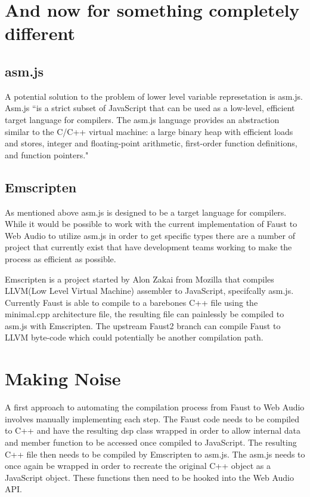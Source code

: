 \documentclass[runningheads,a4paper]{llncs}
\begin{document}
\section{And now for something completely different}

\subsection{asm.js}

A potential solution to the problem of lower level variable represetation is asm.js.  Asm.js ``is a strict subset of JavaScript that can be used as a low-level, efficient target language for compilers. The asm.js language provides an abstraction similar to the C/C++ virtual machine: a large binary heap with efficient loads and stores, integer and floating-point arithmetic, first-order function definitions, and function pointers."\cite{asm-js}

\subsection{Emscripten}

As mentioned above asm.js is designed to be a target language for compilers.  While it would be possible to work with the current implementation of Faust to Web Audio to utilize asm.js in order to get specific types there are a number of project that currently exist that have development teams working to make the process as efficient as possible.

Emscripten is a project started by Alon Zakai from Mozilla that compiles LLVM(Low Level Virtual Machine) assembler to JavaScript, specifcally asm.js.\cite{Emscripten} Currently Faust is able to compile to a barebones C++ file using the minimal.cpp architecture file, the resulting file can painlessly be compiled to asm.js with Emscripten.  The upstream Faust2 branch can compile Faust to LLVM byte-code which could potentially be another compilation path.

\section{Making Noise}

A first approach to automating the compilation process from Faust to Web Audio involves manually implementing each step. The Faust code needs to be compiled to C++ and have the resulting dsp class wrapped in order to allow internal data and member function to be accessed once compiled to JavaScript.  The resulting C++ file then needs to be compiled by Emscripten to asm.js.  The asm.js needs to once again be wrapped in order to recreate the original C++ object as a JavaScript object.  These functions then need to be hooked into the Web Audio API.
\end{document}
